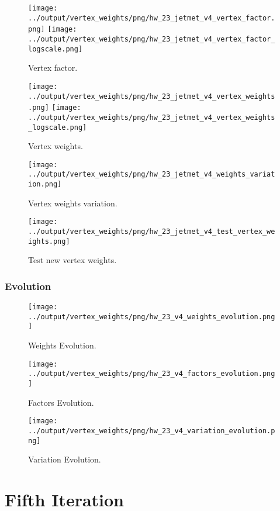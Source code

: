 \documentclass[11pt]{book}
\begin{document}
\begin{figure}[ht]
\centering
\texttt{[image: ../output/vertex\_weights/png/hw\_23\_jetmet\_v4\_vertex\_factor.png]}
\texttt{[image: ../output/vertex\_weights/png/hw\_23\_jetmet\_v4\_vertex\_factor\_logscale.png]}
\caption{Vertex factor.}
\end{figure}

\begin{figure}[ht]
\centering
\texttt{[image: ../output/vertex\_weights/png/hw\_23\_jetmet\_v4\_vertex\_weights.png]}
\texttt{[image: ../output/vertex\_weights/png/hw\_23\_jetmet\_v4\_vertex\_weights\_logscale.png]}
\caption{Vertex weights.}
\end{figure}

\begin{figure}[ht]
\centering
\texttt{[image: ../output/vertex\_weights/png/hw\_23\_jetmet\_v4\_weights\_variation.png]}
\caption{Vertex weights variation.}
\end{figure}

\begin{figure}[ht]
\centering
\texttt{[image: ../output/vertex\_weights/png/hw\_23\_jetmet\_v4\_test\_vertex\_weights.png]}
\caption{Test new vertex weights.}
\end{figure}
\clearpage

\subsection{Evolution}
\begin{figure}[ht]
\centering
\texttt{[image: ../output/vertex\_weights/png/hw\_23\_v4\_weights\_evolution.png]}
\caption{Weights Evolution.}
\end{figure}


\begin{figure}[ht]
\centering
\texttt{[image: ../output/vertex\_weights/png/hw\_23\_v4\_factors\_evolution.png]}
\caption{Factors Evolution.}
\end{figure}

\begin{figure}[ht]
\centering
\texttt{[image: ../output/vertex\_weights/png/hw\_23\_v4\_variation\_evolution.png]}
\caption{Variation Evolution.}
\end{figure}
\clearpage



\chapter{Fifth Iteration}
\end{document}
